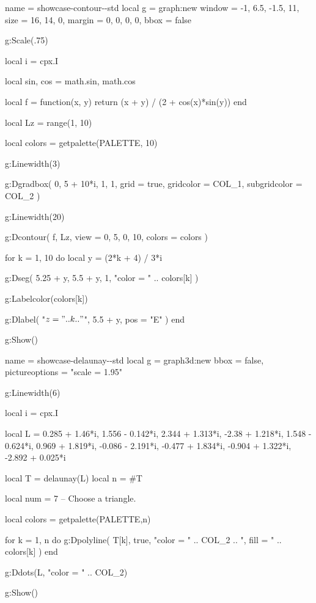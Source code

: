
\newpage

\begin{luadraw}{name = showcase-contour-\PALETTE-std}
local g = graph:new{
  window = {-1, 6.5, -1.5, 11},
  size   = {16, 14, 0},
  margin = {0, 0, 0, 0},
  bbox   = false
}

g:Scale(.75)

local i = cpx.I

local sin, cos = math.sin, math.cos

local f = function(x, y)
  return (x + y) / (2 + cos(x)*sin(y))
end

local Lz = range(1, 10)

local colors = getpalette(PALETTE, 10)

g:Linewidth(3)

g:Dgradbox(
  {0, 5 + 10*i, 1, 1},
  {
    grid         = true,
    gridcolor    = COL_1,
    subgridcolor = COL_2
  }
)

g:Linewidth(20)

g:Dcontour(
  f,
  Lz,
  {
    view   = {0, 5, 0, 10},
    colors = colors
  }
)

for k = 1, 10 do
  local y = (2*k + 4) / 3*i

  g:Dseg(
    {5.25 + y, 5.5 + y},
    1,
    "color = " .. colors[k]
  )

  g:Labelcolor(colors[k])

  g:Dlabel(
    "$z = " .. k .. "$",
    5.5 + y,
    {pos = "E"}
  )
end

g:Show()
\end{luadraw}



\vfill

\begin{luadraw}{name = showcase-delaunay-\PALETTE-std}
local g = graph3d:new{
  bbox           = false,
  pictureoptions = "scale = 1.95"
}

g:Linewidth(6)

local i = cpx.I

local L = {
   0.285 + 1.46*i,
   1.556 - 0.142*i,
   2.344 + 1.313*i,
  -2.38  + 1.218*i,
   1.548 - 0.624*i,
   0.969 + 1.819*i,
  -0.086 - 2.191*i,
  -0.477 + 1.834*i,
  -0.904 + 1.322*i,
  -2.892 + 0.025*i
}

local T = delaunay(L)
local n = #T

local num = 7 -- Choose a triangle.

local colors = getpalette(PALETTE,n)

for k = 1, n do
  g:Dpolyline(
    T[k],
    true,
       "color = " .. COL_2
    .. ", fill = " .. colors[k]
  )
end

g:Ddots(L, "color = " .. COL_2)

g:Show()
\end{luadraw}


